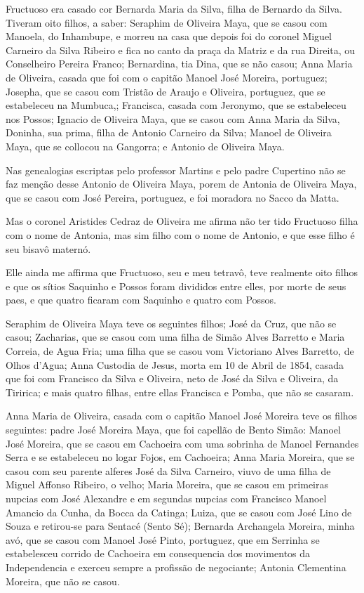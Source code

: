 Fructuoso era casado cor Bernarda Maria da Silva, filha de Bernardo da Silva. Tiveram oito filhos, a saber: Seraphim de Oliveira Maya, que se casou com Manoela, do Inhambupe, e morreu na casa que depois foi do coronel Miguel Carneiro da Silva Ribeiro e fica no canto da praça da Matriz e da rua Direita, ou Conselheiro Pereira Franco; Bernardina, tia Dina, que se não casou; Anna Maria de Oliveira, casada que foi com o capitão Manoel José Moreira, portuguez; Josepha, que se casou com Tristão de Araujo e Oliveira, portuguez, que se estabeleceu na Mumbuca,; Francisca, casada com Jeronymo, que se estabeleceu nos Possos; Ignacio de Oliveira Maya, que se casou com Anna Maria da Silva, Doninha, sua prima, filha de Antonio Carneiro da Silva; Manoel de Oliveira Maya, que se collocou na Gangorra; e Antonio de Oliveira Maya.

Nas genealogias escriptas pelo professor Martins e pelo padre Cupertino não se faz menção desse Antonio de Oliveira Maya, porem de Antonia de Oliveira Maya, que se casou com José Pereira, portuguez, e foi moradora no Sacco da Matta.

Mas o coronel Aristides Cedraz de Oliveira me afirma não ter tido Fructuoso filha com o nome de Antonia, mas sim filho com o nome de Antonio, e que esse filho é seu bisavô maternó.

Elle ainda me affirma que Fructuoso, seu e meu tetravô, teve realmente oito filhos e que os sítios Saquinho e Possos foram divididos entre elles, por morte de seus paes, e que quatro ficaram com Saquinho e quatro com Possos.

Seraphim de Oliveira Maya teve os seguintes filhos; José da Cruz, que não se casou; Zacharias, que se casou com uma filha de Simão Alves Barretto e Maria Correia, de Agua Fria; uma filha que se casou vom Victoriano Alves Barretto, de Olhos d'Agua; Anna Custodia de Jesus, morta em 10 de Abril de 1854, casada que foi com Francisco da Silva e Oliveira, neto de José da Silva e Oliveira, da Tiririca; e mais quatro filhas, entre ellas Francisca e Pomba, que não se casaram.

Anna Maria de Oliveira, casada com o capitão Manoel José Moreira teve os filhos seguintes: padre José Moreira Maya, que foi capellão de Bento Simão: Manoel José Moreira, que se casou em Cachoeira com uma sobrinha de Manoel Fernandes Serra e se estabeleceu no logar Fojos, em Cachoeira; Anna Maria Moreira, que se casou com seu parente alferes José da Silva Carneiro, viuvo de uma filha de Miguel Affonso Ribeiro, o velho; Maria Moreira, que se casou em primeiras nupcias com José Alexandre e em segundas nupcias com Francisco Manoel Amancio da Cunha, da Bocca da Catinga; Luiza, que se casou com José Lino de Souza e retirou-se para Sentacé (Sento Sé); Bernarda Archangela Moreira, minha avó, que se casou com Manoel José Pinto, portuguez, que em Serrinha se estabelesceu corrido de Cachoeira em consequencia dos movimentos da Independencia e exerceu sempre a profissão de negociante; Antonia Clementina Moreira, que não se casou.

